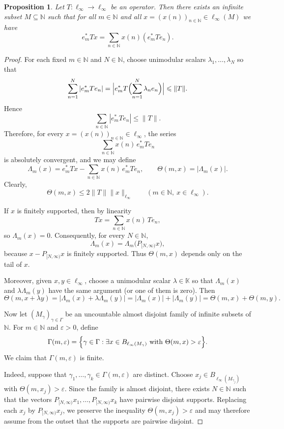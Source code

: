 \documentclass[11pt]{amsart}
\theoremstyle{plain}
\newtheorem{proposition}[theorem]{Proposition}
\theoremstyle{definition}
\numberwithin{equation}{section}
\newcommand{\norm}[1]{\lVert #1 \rVert}
\newcommand{\N}{\mathbb{N}}
\renewcommand{\le}{\leqslant}
\begin{document}
\begin{proposition}\label{prop: l_inf-almost-basis-operators}
    Let $T\colon \ell_\infty \to \ell_\infty$ be an operator. Then there exists an infinite subset $M \subseteq \N$ such that for all $m \in \N$ and all $x = (x(n))_{n \in \N} \in \ell_\infty(M)$ we have
    \begin{equation*}
        e_m^* Tx = \sum_{n \in \N} x(n) (e_m^* T e_n).
    \end{equation*}
\end{proposition}
\begin{proof}
For each fixed $m\in\N$ and $N\in\N$, choose unimodular scalars
$\lambda_1,\dots,\lambda_N$ so that
\[
\sum_{n=1}^N |e_m^*Te_n|
= \Bigl|e_m^*T\Bigl(\sum_{n=1}^N \lambda_n e_n\Bigr)\Bigr|
\le \norm{T}.
\]
Hence
\[
\sum_{n\in\N}|e_m^*Te_n|\le \norm{T}.
\]
Therefore, for every $x=(x(n))_{n\in\N}\in\ell_\infty$, the series
\[
\sum_{n\in\N} x(n)\, e_m^*Te_n
\]
is absolutely convergent, and we may define
\[
\Lambda_m(x)=e_m^*Tx-\sum_{n\in\N} x(n)\,e_m^*Te_n,
\qquad
\Theta(m,x)=|\Lambda_m(x)|.
\]
Clearly,
\[
\Theta(m,x)\le 2\norm{T}\norm{x}_{\ell_\infty}
\qquad (m\in\N,\ x\in\ell_\infty).
\]

If $x$ is finitely supported, then by linearity
\[
Tx=\sum_{n\in\N} x(n)\,Te_n,
\]
so $\Lambda_m(x)=0$. Consequently, for every $N\in\N$,
\[
\Lambda_m(x)=\Lambda_m\bigl(P_{[N,\infty)}x\bigr),
\]
because $x-P_{[N,\infty)}x$ is finitely supported. Thus $\Theta(m,x)$ depends only on the tail of $x$.

Moreover, given $x,y\in\ell_\infty$, choose a unimodular scalar $\lambda\in\mathbb K$
so that $\Lambda_m(x)$ and $\lambda\Lambda_m(y)$ have the same argument (or one of them is zero).
Then
\[
\Theta(m,x+\lambda y)
=|\Lambda_m(x)+\lambda\Lambda_m(y)|
=|\Lambda_m(x)|+|\Lambda_m(y)|
=\Theta(m,x)+\Theta(m,y).
\]

Now let $(M_\gamma)_{\gamma\in\Gamma}$ be an uncountable almost disjoint family of infinite subsets of $\N$.
For $m\in\N$ and $\varepsilon>0$, define
\[
\Gamma(m,\varepsilon)=
\Bigl\{\gamma\in\Gamma:\exists x\in B_{\ell_\infty(M_\gamma)}\text{ with }\Theta(m,x)>\varepsilon\Bigr\}.
\]
We claim that $\Gamma(m,\varepsilon)$ is finite.

Indeed, suppose that $\gamma_1,\dots,\gamma_k\in\Gamma(m,\varepsilon)$ are distinct.
Choose $x_j\in B_{\ell_\infty(M_{\gamma_j})}$ with $\Theta(m,x_j)>\varepsilon$.
Since the family is almost disjoint, there exists $N\in\N$ such that the vectors
$P_{[N,\infty)}x_1,\dots,P_{[N,\infty)}x_k$ have pairwise disjoint supports.
Replacing each $x_j$ by $P_{[N,\infty)}x_j$, we preserve the inequality
$\Theta(m,x_j)>\varepsilon$ and may therefore assume from the outset that the supports are pairwise disjoint.


\end{proof}
\end{document}
